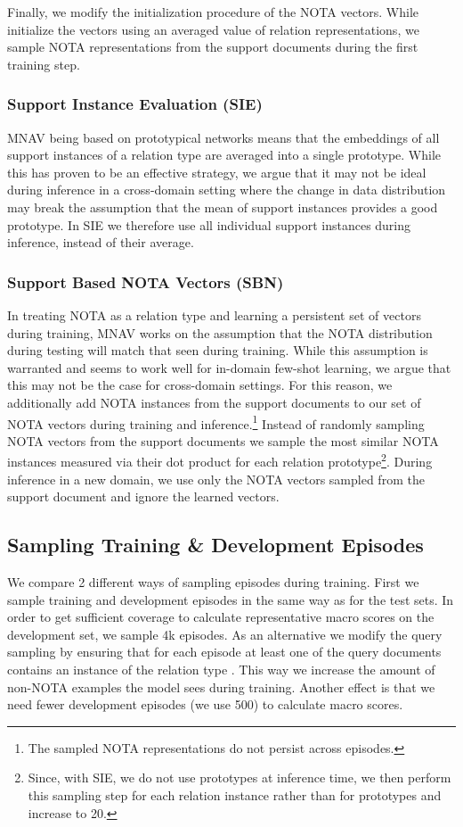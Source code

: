 \documentclass[11pt]{article}
\begin{document}
Finally, we modify the initialization procedure of the NOTA vectors. While 
\citet{sabo_revisiting_2021} 
initialize the vectors using an averaged value of relation representations, we sample NOTA representations from the support documents during the first training step.

\subsubsection{Support Instance Evaluation (SIE)}
MNAV being based on prototypical networks \cite{snell_prototypical_2017} means that the embeddings of all support instances of a relation type are averaged into a single prototype.
While this has proven to be an effective strategy, we argue that it may not be ideal during inference in a cross-domain setting where the change in data distribution may break the assumption that the mean of support instances provides a good prototype.
In SIE we therefore use all individual support instances during inference, instead of their average.



\subsubsection{Support Based NOTA Vectors (SBN)}
In treating NOTA as a relation type and learning a persistent set of vectors during training, MNAV works on the assumption that the NOTA distribution during testing will match that seen during training. 
While this assumption is warranted and seems to work well for in-domain few-shot learning, we argue that this may not be the case for cross-domain settings. 
For this reason, we additionally add NOTA instances from the support documents to our set of NOTA vectors during training and inference.\footnote{The sampled NOTA representations do not persist across episodes.} 
Instead of randomly sampling NOTA vectors from the support documents we sample the most similar  NOTA instances measured via their dot product for each relation prototype\footnote{Since, with SIE, we do not use prototypes at inference time, we then perform this sampling step for each relation instance rather than for prototypes and increase  to 20.}.
During inference in a new domain, we use only the NOTA vectors sampled from the support document and ignore the learned vectors.

\subsection{Sampling Training \& Development Episodes}
\label{sec:train-sampling}
We compare 2 different ways of sampling episodes during training.
First we sample training and development episodes in the same way as for the test sets.
In order to get sufficient coverage to calculate representative macro  scores on the development set, we sample 4k episodes.
As an alternative we modify the query sampling by ensuring that for each episode at least one of the query documents contains an instance of the relation type .
This way we increase the amount of non-NOTA examples the model sees during training.
Another effect is that we need fewer development episodes (we use 500) to calculate macro  scores.
\end{document}
